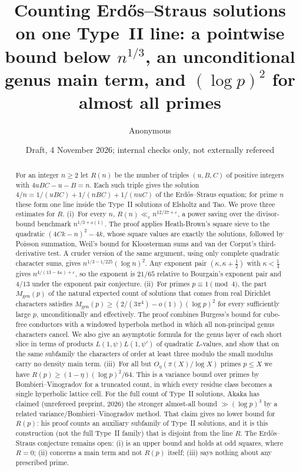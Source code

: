 \documentclass[11pt,reqno]{amsart}
\title[Counting Erd\H{o}s--Straus solutions on one Type~II line]{Counting Erd\H{o}s--Straus solutions on one Type~II line: a pointwise bound below $n^{1/3}$, an unconditional genus main term, and $(\log p)^2$ for almost all primes}
\author{Anonymous}
\date{Draft, 4 November 2026; internal checks only, not externally refereed}
\theoremstyle{definition}
\newcommand{\eps}{\varepsilon}
\newcommand{\Mgen}{M_{\mathrm{gen}}}
\begin{document}
\begin{abstract}
For an integer $n\ge2$ let $R(n)$ be the number of triples $(u,B,C)$ of
positive integers with $4uBC-u-B=n$.  Each such triple gives the
solution $4/n=1/(uBC)+1/(nBC)+1/(nuC)$ of the Erd\H{o}s--Straus equation;
for prime $n$ these form one line inside the Type~II solutions of
Elsholtz and Tao.
We prove three estimates for $R$.  (i)~For every $n$,
$R(n)\ll_\eps n^{12/37+\eps}$, a power saving over the divisor-bound
benchmark $n^{1/3+o(1)}$.  The proof applies Heath-Brown's square sieve
to the quadratic $(4Ck-n)^2-4k$, whose square values are exactly the
solutions, followed by Poisson summation, Weil's bound for Kloosterman
sums and van der Corput's third-derivative test.  A cruder version of
the same argument, using only complete quadratic character sums, gives
$n^{1/3-1/225}(\log n)^2$.  Any exponent pair $(\kappa,\kappa+\frac12)$
with $\kappa<\frac14$ gives $n^{4/(13-4\kappa)+\eps}$, so the exponent is
$21/65$ relative to Bourgain's exponent pair and $4/13$ under the
exponent pair conjecture.  (ii)~For primes $p\equiv1\pmod4$, the part
$\Mgen(p)$ of the natural expected count of solutions that comes from
real Dirichlet characters satisfies
$\Mgen(p)\ge(2/(3\pi^4)-o(1))(\log p)^2$ for every sufficiently large
$p$, unconditionally and effectively.  The proof combines Burgess's
bound for cube-free conductors with a windowed hyperbola method in which
all non-principal genus characters cancel.  We also give an asymptotic
formula for the genus layer of each short slice in terms of products
$L(1,\psi)L(1,\psi')$ of quadratic $L$-values, and show that on the same
subfamily the characters of order at least three modulo the small
modulus carry no density main term.  (iii)~For all but
$O_\eta(\pi(X)/\log X)$ primes $p\le X$ we have
$R(p)\ge(1-\eta)(\log p)^2/64$.  This is a variance bound over primes
by Bombieri--Vinogradov for a truncated count, in which every residue
class becomes a single hyperbolic lattice cell.  For the full count of
Type~II solutions, Akaka has claimed (unrefereed preprint, 2026) the
stronger almost-all bound $\gg(\log p)^3$ by a related
variance/Bombieri--Vinogradov method.  That claim gives no lower bound
for $R(p)$: his proof counts an auxiliary subfamily of Type~II
solutions, and it is this construction (not the full Type~II family)
that is disjoint from the line $R$.  The Erd\H{o}s--Straus conjecture remains open: (i) is an upper
bound and holds at odd squares, where $R=0$; (ii) concerns a main term
and not $R(p)$ itself; (iii) says nothing about any prescribed prime.
\end{abstract}
\maketitle
\end{document}
